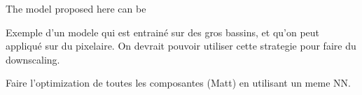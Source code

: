 \documentclass[draft]{agujournal2019}
\begin{document}
The model proposed here can be 

Exemple d'un modele qui est entrainé sur des gros bassins, et qu'on peut appliqué sur du pixelaire. On devrait pouvoir utiliser cette strategie pour faire du downscaling.

Faire l'optimization de toutes les composantes (Matt) en utilisant un meme NN.















%
%
%
%
%
%
%
%
%
%
\end{document}
